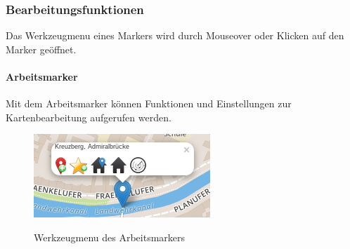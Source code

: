\subsubsection{Bearbeitungsfunktionen}
Das Werkzeugmenu eines Markers wird durch Mouseover oder Klicken auf den Marker geöffnet.

\paragraph{Arbeitsmarker}
Mit dem Arbeitsmarker können Funktionen und Einstellungen zur Kartenbearbeitung aufgerufen werden.

  \begin{figure}[H]
      \centering
	  \includegraphics[scale=0.8]{bilder/screenshots/menu_arbeitsmarker.png}\\ 
  	  \caption{Werkzeugmenu des Arbeitsmarkers}
  \end{figure}

